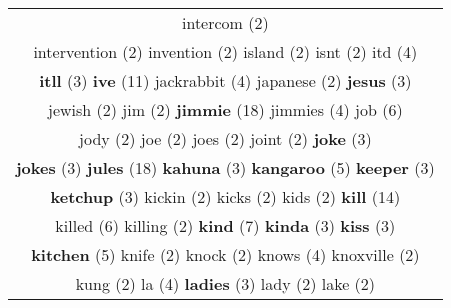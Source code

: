 \documentclass[12pt,a4paper]{article}
\begin{document}
\begin{center}
\begin{longtable}{|c|}
{\footnotesize \textcolor{Verde} {intercom}} \footnotesize{(2)}  \\ {\footnotesize \textcolor{Verde} {intervention}} \footnotesize{(2)} {\footnotesize \textcolor{Verde} {invention}} \footnotesize{(2)} {\footnotesize \textcolor{Verde} {island}} \footnotesize{(2)} {\footnotesize \textcolor{Verde} {isnt}} \footnotesize{(2)} {\normalsize \textcolor{VerdeLocao} {itd}} \footnotesize{(4)}  \\ {\small \textcolor{Laranja} {\bf itll}} \footnotesize{(3)} {\Huge \textcolor{AzulEscuro} {\bf ive}} \footnotesize{(11)} {\normalsize \textcolor{VerdeLocao} {jackrabbit}} \footnotesize{(4)} {\footnotesize \textcolor{Verde} {japanese}} \footnotesize{(2)} {\small \textcolor{Laranja} {\bf jesus}} \footnotesize{(3)}  \\ {\footnotesize \textcolor{Verde} {jewish}} \footnotesize{(2)} {\footnotesize \textcolor{Verde} {jim}} \footnotesize{(2)} {\Huge \textcolor{AzulEscuro} {\bf jimmie}} \footnotesize{(18)} {\normalsize \textcolor{VerdeLocao} {jimmies}} \footnotesize{(4)} {\Large \textcolor{VermEscuro} {job}} \footnotesize{(6)}  \\ {\footnotesize \textcolor{Verde} {jody}} \footnotesize{(2)} {\footnotesize \textcolor{Verde} {joe}} \footnotesize{(2)} {\footnotesize \textcolor{Verde} {joes}} \footnotesize{(2)} {\footnotesize \textcolor{Verde} {joint}} \footnotesize{(2)} {\small \textcolor{Laranja} {\bf joke}} \footnotesize{(3)}  \\ {\small \textcolor{Laranja} {\bf jokes}} \footnotesize{(3)} {\Huge \textcolor{AzulEscuro} {\bf jules}} \footnotesize{(18)} {\small \textcolor{Laranja} {\bf kahuna}} \footnotesize{(3)} {\large \textcolor{Roxo} {\bf kangaroo}} \footnotesize{(5)} {\small \textcolor{Laranja} {\bf keeper}} \footnotesize{(3)}  \\ {\small \textcolor{Laranja} {\bf ketchup}} \footnotesize{(3)} {\footnotesize \textcolor{Verde} {kickin}} \footnotesize{(2)} {\footnotesize \textcolor{Verde} {kicks}} \footnotesize{(2)} {\footnotesize \textcolor{Verde} {kids}} \footnotesize{(2)} {\Huge \textcolor{AzulEscuro} {\bf kill}} \footnotesize{(14)}  \\ {\Large \textcolor{VermEscuro} {killed}} \footnotesize{(6)} {\footnotesize \textcolor{Verde} {killing}} \footnotesize{(2)} {\LARGE \textcolor{Rosa} {\bf kind}} \footnotesize{(7)} {\small \textcolor{Laranja} {\bf kinda}} \footnotesize{(3)} {\small \textcolor{Laranja} {\bf kiss}} \footnotesize{(3)}  \\ {\large \textcolor{Roxo} {\bf kitchen}} \footnotesize{(5)} {\footnotesize \textcolor{Verde} {knife}} \footnotesize{(2)} {\footnotesize \textcolor{Verde} {knock}} \footnotesize{(2)} {\normalsize \textcolor{VerdeLocao} {knows}} \footnotesize{(4)} {\footnotesize \textcolor{Verde} {knoxville}} \footnotesize{(2)}  \\ {\footnotesize \textcolor{Verde} {kung}} \footnotesize{(2)} {\normalsize \textcolor{VerdeLocao} {la}} \footnotesize{(4)} {\small \textcolor{Laranja} {\bf ladies}} \footnotesize{(3)} {\footnotesize \textcolor{Verde} {lady}} \footnotesize{(2)} {\footnotesize \textcolor{Verde} {lake}} \footnotesize{(2)}  
\end{longtable}
\end{center}
\end{document}

